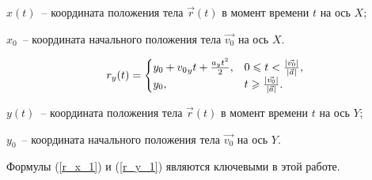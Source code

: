 \begin{Underequation}
  \(x(t)\)~-- координата положения тела \(\vec{r}(t)\) в момент времени \(t\) на ось \(X\);

  \(x_0\)~-- координата начального положения тела \(\vec{v_0}\) на ось \(X\).
\end{Underequation}

\begin{equation}\label{r_y_1}
  r_y(t) =
  \begin{cases}
    y_0 + {v_0}_y t + \frac{a_y t^2}{2}, & 0 \leqslant t < \frac{\left|\vec{v_0}\right|}{\left|\vec{a}\right|}, \\
    y_0,                                 & t \geqslant \frac{\left|\vec{v_0}\right|}{\left|\vec{a}\right|}.
  \end{cases}
\end{equation}

\begin{Underequation}
  \(y(t)\)~-- координата положения тела \(\vec{r}(t)\) в момент времени \(t\) на ось \(Y\);

  \(y_0\)~-- координата начального положения тела \(\vec{v_0}\) на ось \(Y\).
\end{Underequation}

Формулы (\ref{r_x_1}) и (\ref{r_y_1}) являются ключевыми в этой работе.
